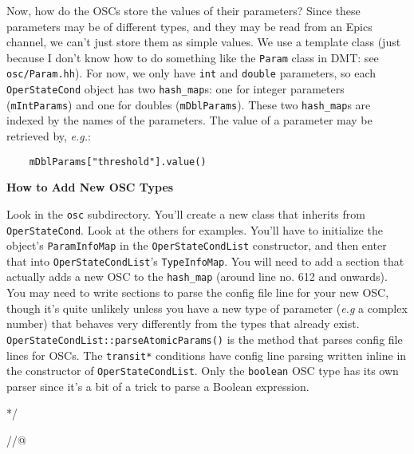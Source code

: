 {Now, how do the OSCs store the values of their parameters?  Since
these parameters may be of different types, and they may be read from
an Epics channel, we can't just store them as simple values.  We use a
template class (just because I don't know how to do something like the
\texttt{Param} class in DMT: see \texttt{osc/Param.hh}).  For now, we
only have \texttt{int} and \texttt{double} parameters, so each
\texttt{OperStateCond} object has two \texttt{hash\_map}s: one for
integer parameters (\texttt{mIntParams}) and one for doubles
(\texttt{mDblParams}).  These two \texttt{hash\_map}s are indexed by
the names of the parameters. The value of a parameter may be retrieved
by, \textit{e.g.}:

\begin{verbatim}
    mDblParams["threshold"].value()
\end{verbatim}

\begin{center}
  \textbf{How to Add New OSC Types}
\end{center}

Look in the \texttt{osc} subdirectory.  You'll create a new class that
inherits from \texttt{OperStateCond}.  Look at the others for
examples.  You'll have to initialize the object's
\texttt{ParamInfoMap} in the \texttt{OperStateCondList} constructor,
and then enter that into \texttt{OperStateCondList}'s
\texttt{TypeInfoMap}.  You will need to add a section that actually
adds a new OSC to the \texttt{hash\_map} (around line no. 612 and
onwards).  You may need to write sections to parse the config file
line for your new OSC, though it's quite unlikely unless you have a
new type of parameter (\textit{e.g} a complex number) that behaves
very differently from the types that already exist.
\texttt{OperStateCondList::parseAtomicParams()} is the method that
parses config file lines for OSCs.  The \texttt{transit*} conditions
have config line parsing written inline in the constructor of
\texttt{OperStateCondList}.  Only the \texttt{boolean} OSC type has
its own parser since it's a bit of a trick to parse a Boolean
expression.

*/

//@}
